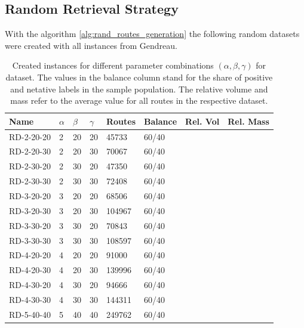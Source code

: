 \subsection{Random Retrieval Strategy}
With the algorithm \ref{alg:rand_routes_generation} the following random datasets were created with all
instances from Gendreau.
\begin{table}[h!]
    \centering
    \begin{tabular}{@{}P{0.13\textwidth}P{0.08\textwidth}P{0.08\textwidth}P{0.08\textwidth}P{0.09\textwidth}P{0.10\textwidth}P{0.12\textwidth}P{0.12\textwidth}@{}}
        \midrule
        Name       & $\alpha$ & $\beta$ & $\gamma$ & Routes & Balance & Rel. Vol & Rel. Mass \\
        \bottomrule
        RD-2-20-20 & 2        & 20      & 20       & 45733  & 60/40   &          &           \\
        RD-2-20-30 & 2        & 20      & 30       & 70067  & 60/40   &          &           \\
        RD-2-30-20 & 2        & 30      & 20       & 47350  & 60/40   &          &           \\
        RD-2-30-30 & 2        & 30      & 30       & 72408  & 60/40   &          &           \\
        RD-3-20-20 & 3        & 20      & 20       & 68506  & 60/40   &          &           \\
        RD-3-20-30 & 3        & 20      & 30       & 104967 & 60/40   &          &           \\
        RD-3-30-20 & 3        & 30      & 20       & 70843  & 60/40   &          &           \\
        RD-3-30-30 & 3        & 30      & 30       & 108597 & 60/40   &          &           \\
        RD-4-20-20 & 4        & 20      & 20       & 91000  & 60/40   &          &           \\
        RD-4-20-30 & 4        & 20      & 30       & 139996 & 60/40   &          &           \\
        RD-4-30-20 & 4        & 30      & 20       & 94666  & 60/40   &          &           \\
        RD-4-30-30 & 4        & 30      & 30       & 144311 & 60/40   &          &           \\
        RD-5-40-40 & 5        & 40      & 40       & 249762 & 60/40   &          &           \\
        \bottomrule
    \end{tabular}
    \caption[Created instances for different parameter combinations $(\alpha, \beta, \gamma)$ for \gendreauDataSetText dataset.]{Created instances for different parameter combinations $(\alpha, \beta, \gamma)$ for \gendreauDataSetText dataset.
        The values in the balance column stand for the share of positive and netative labels in the sample population. The relative volume
        and mass refer to the average value for all routes in the respective dataset.}
    \label{tab:created_instances_xyz_gendreau}
\end{table}

